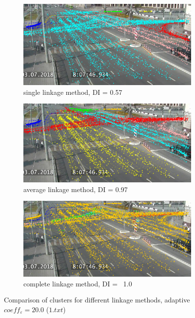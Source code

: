 \begin{figure}[!htb]
	\centering
	\begin{subfigure}[!htb]{0.3\textwidth}
		\centering{}
		\includegraphics[width=\textwidth]{images/link_meth_comp_adapt_min.png}
		\caption{single linkage method, DI = 0.57}
		\label{fig:link-meth-comp-adapt-min}
	\end{subfigure}
	\hfill
	\begin{subfigure}[!htb]{0.3\textwidth}
		\centering{}
		\includegraphics[width=\textwidth]{images/link_meth_comp_adapt_avg.png}
		\caption{average linkage method, DI = 0.97}
		\label{fig:link-meth-comp-adapt-avg}
	\end{subfigure}
	\hfill
	\begin{subfigure}[!htb]{0.3\textwidth}
		\centering{}
		\includegraphics[width=\textwidth]{images/link_meth_comp_adapt_max.png}
		\caption{complete linkage method, DI = ~1.0}
		\label{fig:link-meth-comp-adapt-max}
	\end{subfigure}
	\caption{Comparison of clusters for different linkage methods, adaptive $coeff_\varepsilon = 20.0$ ($1.txt$)}
	\label{fig:link-meth-comp-adapt}
\end{figure}


